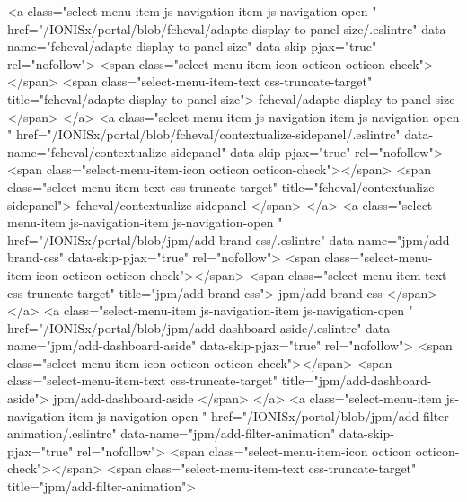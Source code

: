             <a class="select-menu-item js-navigation-item js-navigation-open "
               href="/IONISx/portal/blob/fcheval/adapte-display-to-panel-size/.eslintrc"
               data-name="fcheval/adapte-display-to-panel-size"
               data-skip-pjax="true"
               rel="nofollow">
              <span class="select-menu-item-icon octicon octicon-check"></span>
              <span class="select-menu-item-text css-truncate-target" title="fcheval/adapte-display-to-panel-size">
                fcheval/adapte-display-to-panel-size
              </span>
            </a>
            <a class="select-menu-item js-navigation-item js-navigation-open "
               href="/IONISx/portal/blob/fcheval/contextualize-sidepanel/.eslintrc"
               data-name="fcheval/contextualize-sidepanel"
               data-skip-pjax="true"
               rel="nofollow">
              <span class="select-menu-item-icon octicon octicon-check"></span>
              <span class="select-menu-item-text css-truncate-target" title="fcheval/contextualize-sidepanel">
                fcheval/contextualize-sidepanel
              </span>
            </a>
            <a class="select-menu-item js-navigation-item js-navigation-open "
               href="/IONISx/portal/blob/jpm/add-brand-css/.eslintrc"
               data-name="jpm/add-brand-css"
               data-skip-pjax="true"
               rel="nofollow">
              <span class="select-menu-item-icon octicon octicon-check"></span>
              <span class="select-menu-item-text css-truncate-target" title="jpm/add-brand-css">
                jpm/add-brand-css
              </span>
            </a>
            <a class="select-menu-item js-navigation-item js-navigation-open "
               href="/IONISx/portal/blob/jpm/add-dashboard-aside/.eslintrc"
               data-name="jpm/add-dashboard-aside"
               data-skip-pjax="true"
               rel="nofollow">
              <span class="select-menu-item-icon octicon octicon-check"></span>
              <span class="select-menu-item-text css-truncate-target" title="jpm/add-dashboard-aside">
                jpm/add-dashboard-aside
              </span>
            </a>
            <a class="select-menu-item js-navigation-item js-navigation-open "
               href="/IONISx/portal/blob/jpm/add-filter-animation/.eslintrc"
               data-name="jpm/add-filter-animation"
               data-skip-pjax="true"
               rel="nofollow">
              <span class="select-menu-item-icon octicon octicon-check"></span>
              <span class="select-menu-item-text css-truncate-target" title="jpm/add-filter-animation">
